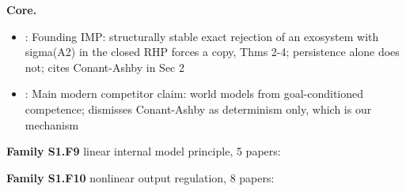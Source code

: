 \documentclass[10pt]{article}
\newcommand{\memb}[1]{\par\smallskip\textbf{#1}\quad}
\begin{document}
\memb{Core.}
\begin{itemize}[nosep,leftmargin=1.2em]
\item \citet{Francis-internal76}: Founding IMP: structurally stable exact rejection of an exosystem with sigma(A2) in the closed RHP forces a copy, Thms 2-4; persistence alone does not; cites Conant-Ashby in Sec 2
\item \citet{Richens-general25}: Main modern competitor claim: world models from goal-conditioned competence; dismisses Conant-Ashby as determinism only, which is our mechanism
\end{itemize}
\memb{Family S1.F9} linear internal model principle, 5 papers: {\footnotesize \citetext{\citealp{Francis-internal76}; \citealp{Francis-synthesis74}; \citealp{Davison-robust76}; \citealp{Wonham-tracking74}; \citealp{Bengtsson-output77}}}

\memb{Family S1.F10} nonlinear output regulation, 8 papers: {\footnotesize \citetext{\citealp{Hepburn-error84}; \citealp{Isidori-output90}; \citealp{Isidori-internal25}\dag; \citealp{Serrani-semiglobal01}; \citealp{Byrnes-limit03}; \citealp{Huang-general04}\dag; \citealp{Marconi-output07}; \citealp{Bin-robust24}}}
\end{document}
